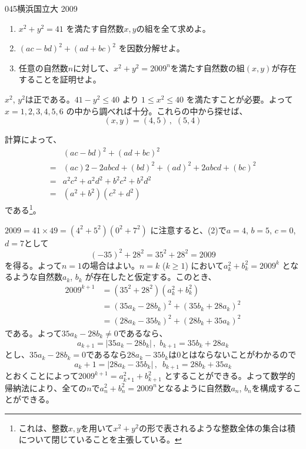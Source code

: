 \begin{prob}{045}{}{横浜国立大 2009}
 \begin{enumerate}
  \item $x^2+y^2=41$ を満たす自然数$x,y$の組を全て求めよ。
  \item $(ac-bd)^2+(ad+bc)^2$ を因数分解せよ。
  \item 任意の自然数$n$に対して、$x^2+y^2=2009^n$を満たす自然数の組$(x,y)$が存在することを証明せよ。
 \end{enumerate}
\end{prob}
$x^2$, $y^2$は正である。$41-y^2\le 40$ より $1\le x^2\le 40$ を満たすことが必要。よって$x=1,2,3,4,5,6$ の中から調べれば十分。これらの中から探せば、
\[ (x,y)=(4,5)\,,\,\, (5,4) \]

計算によって、
\begin{align*}
 &(ac-bd)^2+(ad+bc)^2 \\
 =& (ac)2-2abcd+(bd)^2+(ad)^2+2abcd+(bc)^2 \\
 =& a^2c^2+a^2d^2+b^2c^2+b^2d^2 \\
 =& (a^2+b^2)(c^2+d^2)
\end{align*}
である\footnote{これは、整数$x,y$を用いて$x^2+y^2$の形で表されるような整数全体の集合は積について閉じていることを主張している。}。

$2009=41\times49=(4^2+5^2)(0^2+7^2)$ に注意すると、(2)で$a=4$, $b=5$, $c=0$, $d=7$として
\[ (-35)^2+28^2=35^2+28^2=2009 \]
を得る。よって$n=1$の場合はよい。$n=k$ ($k\ge 1$) において$a_k^2+b_k^2=2009^k$ となるような自然数$a_k$, $b_k$ が存在したと仮定する。このとき、
\begin{align*}
 2009^{k+1}&=(35^2+28^2)(a_k^2+b_k^2) \\
 &=(35a_k-28b_k)^2+(35b_k+28a_k)^2 \\
 &=(28a_k-35b_k)^2+(28b_k+35a_k)^2
\end{align*}
である。よって$35a_k-28b_k\neq 0$であるなら、
\[ a_{k+1}=|35a_k-28b_k| \,,\,\, b_{k+1}=35b_k+28a_k \]
とし、$35a_k-28b_k=0$であるなら$28a_k-35b_k$は0とはならないことがわかるので
\[ a_k+1=|28a_k-35b_k| \,,\,\,\, b_{k+1}=28b_k+35a_k \]
とおくことによって$2009^{k+1}=a_{k*1}^2+b_{k+1}^2$ とすることができる。よって数学的帰納法により、全ての$n$で$a_n^2+b_n^2=2009^n$となるように自然数$a_n$, $b_n$を構成することができる。